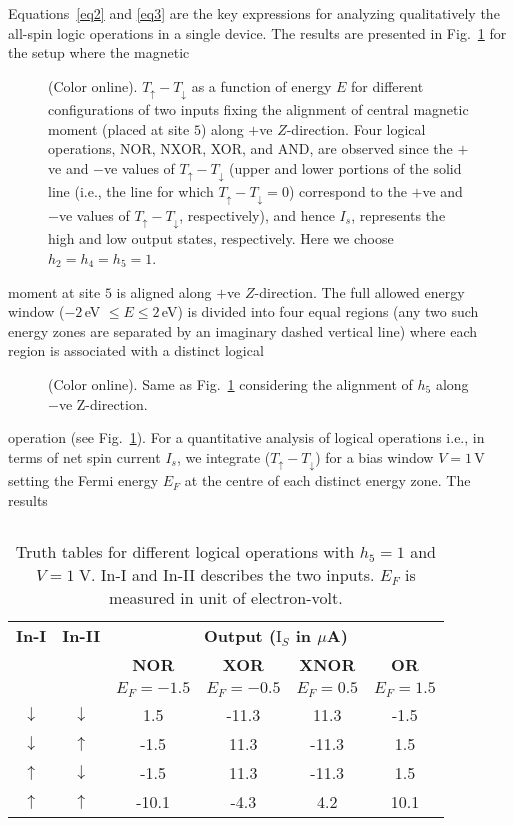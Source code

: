 \documentclass[doublecol]{epl2}
\begin{document}
Equations~\ref{eq2} and \ref{eq3} are the key expressions for analyzing 
qualitatively the all-spin logic operations in a single device.
The results are presented in Fig.~\ref{f2} for the setup where the magnetic 
\begin{figure}[ht]
{\centering {}\par}
\caption{(Color online). $T_{\uparrow}-T_{\downarrow}$ as a function of energy 
$E$ for different configurations of two inputs fixing the alignment of central 
magnetic moment (placed at site $5$) along $+$ve $Z$-direction. Four logical 
operations, NOR, NXOR, XOR, and AND, are observed since the $+$ve and $-$ve 
values of $T_{\uparrow}-T_{\downarrow}$ (upper and lower 
portions of the solid line (i.e., the line for which 
$T_{\uparrow}-T_{\downarrow}=0$) correspond to the $+$ve and $-$ve values of 
$T_{\uparrow}-T_{\downarrow}$, respectively), and hence $I_s$, represents 
the high and low output states, respectively. Here we choose $h_2=h_4=h_5=1$.}
\label{f2}
\end{figure}
moment at site $5$ is aligned along $+$ve $Z$-direction. The full allowed 
energy window ($-2\,$eV $\le E \le 2\,$eV) is divided into four
equal regions (any two such energy zones are separated by an imaginary dashed 
vertical line) where each region is associated with a distinct logical 
\begin{figure}[ht]
{\centering {}\par}
\caption{(Color online). Same as Fig.~\ref{f2} considering the alignment
of $h_5$ along $-$ve Z-direction.}
\label{f3}
\end{figure}
operation (see Fig.~\ref{f2}). For a quantitative analysis of logical
operations i.e., in terms of net spin current $I_s$, we integrate
($T_{\uparrow}-T_{\downarrow}$) for a bias window $V=1\,$V setting the
Fermi energy $E_F$ at the centre of each distinct energy zone. The results
\begin{table}[ht]
\caption{Truth tables for different logical operations with $h_5=1$ and
$V=1\;$V. In-I and In-II describes the two inputs. $E_F$ is measured in 
unit of electron-volt.} 
$~$ 
\vskip -0.25cm
\fontsize{7}{7}
\begin{tabular}{|c|c|c|c|c|c|}
 \hline
\textbf{In-I} & \textbf{In-II} &
\multicolumn{4}{c|}{\textbf{Output ($\mbox{I}_S$ in $\mu$A)}} \\
\cline{3-6}
 &  & \textbf{NOR} &\textbf{XOR} & \textbf{XNOR} & \textbf{OR} \\
 &  & $E_F=-1.5$ & $E_F=-0.5$ & $E_F=0.5$ & $E_F=1.5$ \\
 \hline
 $\downarrow$  & $\downarrow$ & 1.5 & -11.3 & 11.3 & -1.5 \\
    $\downarrow$  & $\uparrow$  & -1.5 & 11.3 & -11.3 & 1.5 \\
    $\uparrow$  & $\downarrow$  & -1.5 & 11.3 & -11.3 & 1.5 \\
    $\uparrow$  & $\uparrow$  & -10.1 & -4.3 & 4.2 & 10.1 \\
 \hline
\end{tabular}
\label{tab1}
\end{table}
\end{document}
